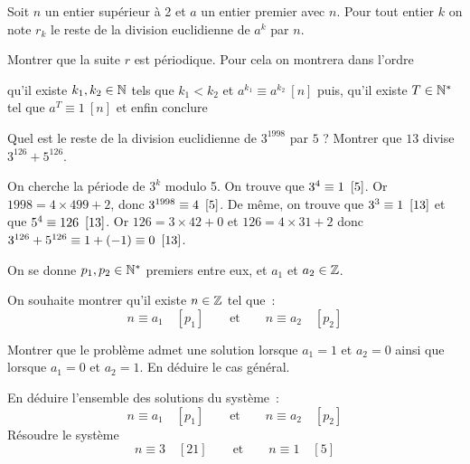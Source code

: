 \documentclass{magnolia}
\begin{document}
Soit $n$ un entier supérieur à 2 et $a$ un entier premier avec $n$. Pour tout
entier $k$ on note $r_k$ le reste de la division euclidienne de $a^k$ par $n$.
\begin{questions}
\question Montrer que la suite $r$ est périodique. Pour cela on montrera dans
  l'ordre
  \begin{questions}
  \question qu'il existe $k_1,k_2\in\mathbb{N}$ tels que $k_1<k_2$ et $a^{k_1}\equiv a^{k_2}\ [n]$
  \question puis, qu'il existe $T\in{\mathbb{N}^*}$ tel que $a^T\equiv 1\ [n]$
  \question et enfin conclure
  \end{questions}
\question Quel est le reste de la division euclidienne de $3^{1998}$ par $5$ ?
\question Montrer que $13$ divise $3^{126}+5^{126}$.
\end{questions}
\begin{sol}
\begin{questions}
\question
\question On cherche la période de $3^k$ modulo 5. On trouve que $3^4\equiv 1\ \cro{5}$. Or $1998=4\times 499+2$, donc $3^{1998}\equiv 4\ \left[5\right]$.
\question De même, on trouve que $3^3\equiv 1\ \cro{13}$ et que $5^4\equiv 126\ \cro{13}$. Or $126=3\times 42+0$ et $126=4\times 31+2$ donc
  $3^{126}+5^{126}\equiv 1+(-1)\equiv 0\ \cro{13}$.
\end{questions}
\end{sol}
On se donne $p_1, p_2\in{\mathbb{N}^*}$ premiers entre eux, et $a_1$ et $a_2\in\mathbb{Z}$. 
\begin{questions}
\question On souhaite montrer qu'il existe $n\in\mathbb{Z}$ tel que~:
  \[n\equiv a_1 \quad [p_1] \qquad \text{et} \qquad n\equiv a_2 \quad [p_2]\]
  \begin{questions}
  \question Montrer que le problème admet une solution lorsque $a_1=1$ et
    $a_2=0$ ainsi que lorsque $a_1=0$ et $a_2=1$.
  \question En déduire le cas général.
  \end{questions}
\question En déduire l'ensemble des solutions du système~:
  \[n\equiv a_1 \quad [p_1] \qquad \text{et} \qquad n\equiv a_2 \quad [p_2]\]
 Résoudre le système
    \[n\equiv 3 \quad [21] \qquad \text{et} \qquad n\equiv 1 \quad [5]\]
\end{questions}
\end{document}
